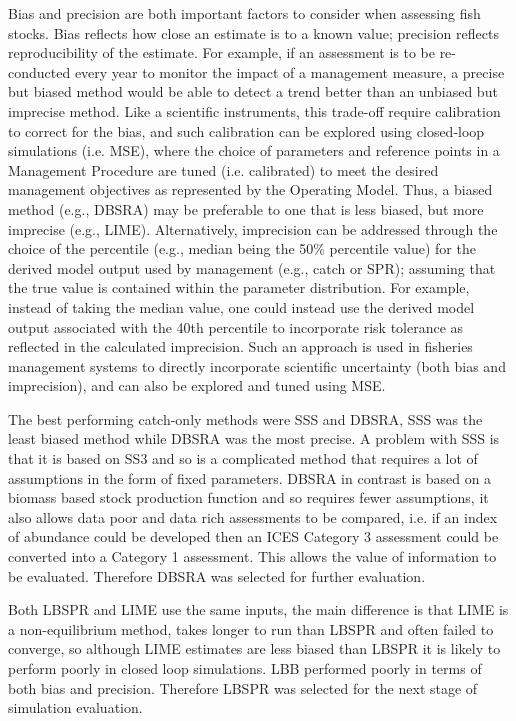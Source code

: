 Bias and precision are both important factors to consider when assessing fish stocks. Bias reflects how close an estimate is to a known value; precision reflects reproducibility of the estimate. For example, if an assessment is to be re-conducted every year to monitor the impact of a management measure, a precise but biased method would be able to detect a trend better than an unbiased but imprecise method. Like a scientific instruments, this trade-off require calibration to correct for the bias, and such calibration can be explored using closed-loop simulations (i.e. MSE), where the choice of parameters and reference points in a Management Procedure are tuned (i.e. calibrated) to meet the desired management objectives as represented by the Operating Model. Thus, a biased method (e.g., DBSRA) may be preferable to one that is less biased, but more imprecise (e.g., LIME). Alternatively, imprecision can be addressed through the choice of the percentile (e.g., median being the 50\% percentile value) for the derived model output used by management (e.g., catch or SPR); assuming that the true value is contained within the parameter distribution. For example, instead of taking the median value, one could instead use the derived model output associated with the 40th percentile to incorporate risk tolerance as reflected in the calculated imprecision. Such an approach \citep{Ralston2011meta} is used in fisheries management systems to directly incorporate scientific uncertainty (both bias and imprecision), and can also be explored and tuned using MSE.

The best performing catch-only methods were SSS and DBSRA, SSS was the least biased method while DBSRA was the most precise. A problem with SSS is that it is based on SS3 and so is a complicated method that requires a lot of assumptions in the form of fixed parameters. DBSRA in contrast is based on a biomass based stock production function and so requires fewer assumptions, it also allows data poor and data rich assessments to be compared, i.e. if an index of abundance could be developed then an ICES Category 3 assessment could be converted into a Category 1 assessment. This allows the value of information to be evaluated. Therefore DBSRA was selected for further evaluation.  

Both LBSPR and LIME use the same inputs, the main difference is that LIME is a non-equilibrium method, takes longer to run than LBSPR and often failed to converge, so although LIME estimates are less biased than LBSPR it is likely to perform poorly in closed loop simulations. LBB performed poorly in terms of both bias and precision. Therefore LBSPR was selected for the next stage of simulation evaluation.


